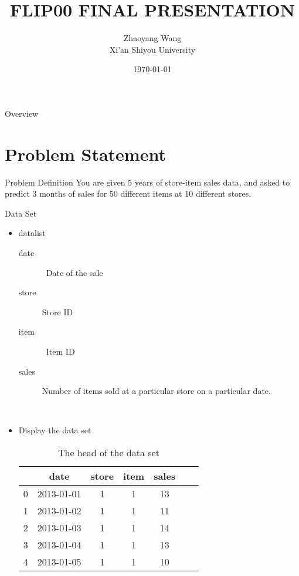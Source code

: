 \documentclass[
 size=12pt,
 paper=smartboard, %
 mode=present, %
 display=slides, %
style=tuliplab,
pauseslide,
fleqn,leqno]{powerdot}
\title{FLIP00 FINAL PRESENTATION}
\author{
Zhaoyang Wang
\\
Xi'an Shiyou University 
}
\date{\today}
\begin{document}
\maketitle 
\begin{slide}[toc=,bm=]{Overview}
  \tableofcontents[content=sections]
\end{slide}

  \section{Problem Statement}

  \begin{slide}{Problem Definition}
  You are given 5 years of store-item sales data, and asked to predict 3 months of sales for 50 different items at 10 different stores.
  \end{slide}
  \begin{slide}{Data Set}
  \begin{itemize}
    \item datalist
    \begin{description}
      \item [date]\,  Date of the sale
      \item [store] Store ID
      \item [item]\,  Item ID
      \item [sales] Number of items sold at a particular store on a particular date.
    \end{description}
    \

  \item Display the data set 
  \begin{table}[htbp]  \centering
    \caption{The head of the data set}
    \label{tbl:data information}
    \begin{tabular}{ccccccc}
      \hline
      & date & store & item & sales\\
      \hline
      0 & 2013-01-01 & 1 & 1 & 13 \\
      1 & 2013-01-02 & 1 & 1 & 11 \\
      2 & 2013-01-03 & 1 & 1 & 14 \\
      3 & 2013-01-04 & 1 & 1 & 13 \\
      4 & 2013-01-05 & 1 & 1 & 10 \\
      \hline 
    \end{tabular}
  \end{table}
  \end{itemize}
\end{slide}
\end{document}
